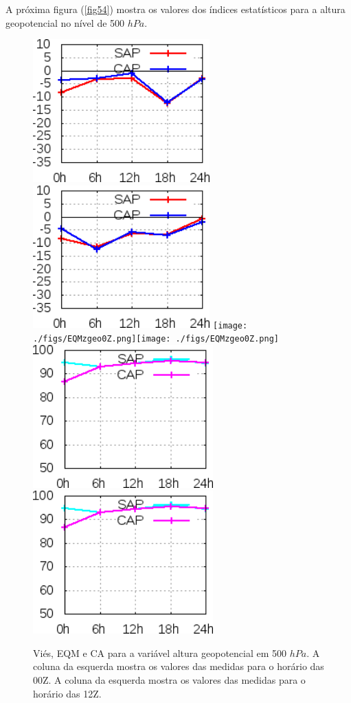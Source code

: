 A próxima figura (\autoref{fig54}) mostra os valores dos índices estatísticos para a altura geopotencial no nível de 500 $hPa$.

\begin{figure}[!hbp]
\includegraphics[height=5.5cm]{./figs/VIES500zgeo0Z.png}\includegraphics[height=5.5cm]{./figs/VIES500zgeo12Z.png}
\texttt{[image: ./figs/EQMzgeo0Z.png]}\texttt{[image: ./figs/EQMzgeo0Z.png]}
\includegraphics[height=5.5cm]{./figs/CA500zgeo0Z.png}\includegraphics[height=5.5cm]{./figs/CA500zgeo0Z.png}
\caption{Viés, EQM e CA para a variável altura geopotencial em 500 $hPa$. A coluna da esquerda mostra os valores das medidas para o horário das 00Z. A coluna da esquerda mostra os valores das medidas para o horário das 12Z.}
\label{fig54}
\end{figure}

